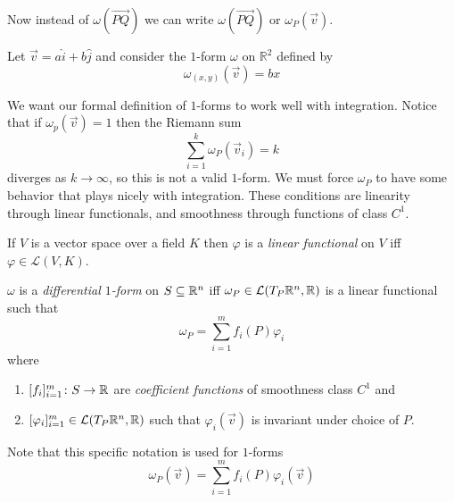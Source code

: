 \documentclass[notes]{subfiles}
\begin{document}
Now instead of $\omega(\vec{PQ})$ we can write $\omega(\vec{PQ})$ or $\omega_{P}(\vec{v})$.

\begin{example}
    Let $\vec{v} = a\hat{i} + b\hat{j}$ and consider the $1$-form $\omega$ on $\mathbb{R}^2$ defined by
    \[
        \omega_{(x, y)}(\vec{v}) = bx
    \]
\end{example}

We want our formal definition of $1$-forms to work well with integration. Notice that if $\omega_p(\vec{v}) = 1$ then the Riemann sum
\[
    \sum_{i = 1}^k \omega_P(\vec{v}_i) = k
\]
diverges as $k \to \infty$, so this is not a valid $1$-form. We must force $\omega_P$ to have some behavior that plays nicely with integration. These conditions are linearity through linear functionals, and smoothness through functions of class $C^1$.

\begin{definition}
    If $V$ is a vector space over a field $K$ then $\varphi$ is a \textit{linear functional} on $V$ iff $\varphi \in \mathcal{L}(V, K)$.
\end{definition}

\begin{definition}
    $\omega$ is a \textit{differential $1$-form} on $S \subseteq \mathbb{R}^n$ iff $\omega_P \in \mathcal{L}(T_P \mathbb{R}^n, \mathbb{R})$ is a linear functional such that
    \[
        \omega_P = \sum_{i = 1}^m f_i(P)\varphi_i
    \]
    where
    \begin{enumerate}[label = \arabic*)]
        \item $[f_i]_{i = 1}^m\colon S \to \mathbb{R}$ are \textit{coefficient functions} of smoothness class $C^1$ and
        \item $[\varphi_i]_{i = 1}^m \in \mathcal{L}(T_P \mathbb{R}^n, \mathbb{R})$ such that $\varphi_i(\vec{v})$ is invariant under choice of $P$.
    \end{enumerate}
    Note that this specific notation is used for $1$-forms
    \[
        \omega_P(\vec{v}) = \sum_{i = 1}^m f_i(P)\varphi_i(\vec{v})
    \]
\end{definition}
\end{document}
